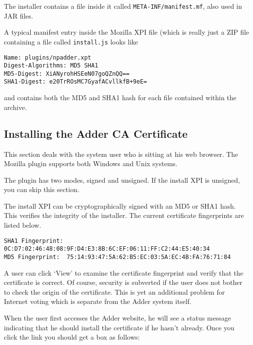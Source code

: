 \documentclass[letterpaper,10pt]{article}
\begin{document}
The installer contains a file inside it called
\texttt{META-INF/manifest.mf}, also used in JAR files.

A typical manifest entry inside the Mozilla XPI file (which is
really just a ZIP file containing a file called \texttt{install.js}
looks like

\begin{footnotesize}
\begin{verbatim}
Name: plugins/npadder.xpt
Digest-Algorithms: MD5 SHA1
MD5-Digest: XiANyrohHSEeN07goQZnQQ==
SHA1-Digest: e20TrROsMC7GyafACvllkfB+9eE=
\end{verbatim}
\end{footnotesize}

and contains both the MD5 and SHA1 hash for each file contained
within the archive.

\subsection{Installing the Adder CA Certificate}

This section deals with the system user who is sitting at his web
browser. The Mozilla plugin supports both Windows and Unix systems.

The plugin has two modes, signed and unsigned. If the install XPI
is unsigned, you can skip this section.

The install XPI can be cryptographically signed with an MD5 or SHA1
hash. This verifies the integrity of the installer. The current
certificate fingerprints are listed below.

\begin{footnotesize}
\begin{verbatim}
SHA1 Fingerprint: 0C:D7:02:46:48:08:9F:D4:E3:8B:6C:EF:06:11:FF:C2:44:E5:40:34
MD5 Fingerprint:  75:14:93:47:5A:62:B5:EC:03:5A:EC:4B:FA:76:71:84
\end{verbatim}
\end{footnotesize}

A user can click `View' to examine the certificate fingerprint and
verify that the certificate is correct. Of course, security is
subverted if the user does not bother to check the origin of the
certificate. This is yet an additional problem for Internet voting
which is separate from the Adder system itself.

When the user first accesses the Adder website, he will see a status
message indicating that he should install the certificate if he
hasn't already. Once you click the link you should get a box as
follows:
\end{document}
